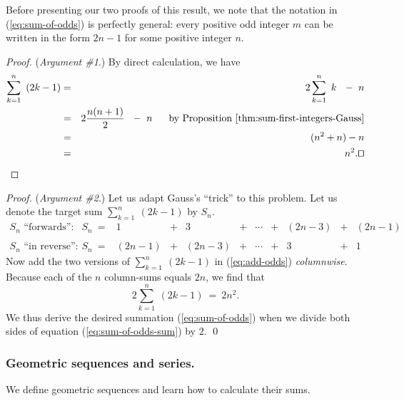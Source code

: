 {Before presenting our two proofs of this result, we note that the
notation in (\ref{eq:sum-of-odds}) is perfectly general: every positive
odd integer $m$ can be written in the form $2n-1$ for some positive
integer $n$.

\smallskip

\begin{proof}
({\it Argument \#1}.)
%
By direct calculation, we have
\begin{eqnarray*}
\sum_{k=1}^n \ \left( 2k-1 \right)
   & = & 2 \sum_{k=1}^n \ k \ \ - \ n \\
   & = & 2 \frac{n (n+1)}{2} \ \ - \ n \ \ \ \ \mbox{ by
  Proposition~\ref{thm:sum-first-integers-Gauss}} \\
   & = & (n^2 + n) - n \\
   & = & n^2. \hfill \qed
\end{eqnarray*}
\end{proof}

\medskip

\begin{proof}
({\it Argument \#2}.)
%
Let us adapt Gauss's ``trick'' to this problem.  Let us denote the
target sum $\sum_{k=1}^n \ (2k-1)$ by $S_n$. 
\begin{equation}
\label{eq:add-odds}
\begin{array}{llccccccccc}
\mbox{$S_n$ ``forwards'':} &
S_n \ = 
& 1 & + & 3 & + & \cdots & + & (2n-3) & + & (2n-1) \\
 & & & & & & & & & &  \\
\mbox{$S_n$ ``in reverse'':} &
S_n \ =
& (2n-1) & + & (2n-3) & + & \cdots & + & 3 & + & 1
\end{array}
\end{equation}
Now add the two versions of $\sum_{k=1}^n \ (2k-1)$ in (\ref{eq:add-odds})
{\em columnwise}.  Because each of the $n$ column-sums equals $2n$, we
find that
\begin{equation}
\label{eq:sum-of-odds-sum}
2 \sum_{k=1}^n \ (2k-1) \ = \ 2n^2.
\end{equation}
We thus derive the desired summation (\ref{eq:sum-of-odds}) when we
divide both sides of equation (\ref{eq:sum-of-odds-sum}) by $2$.  \qed
\end{proof}

\subsubsection{Geometric sequences and series.}
\label{sec:geometric-sums}
%
We define geometric sequences and learn how to calculate their sums.

}
